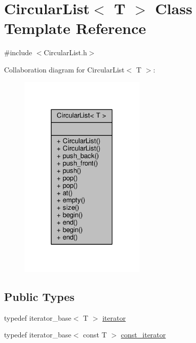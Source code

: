 \hypertarget{classCircularList}{\section{Circular\-List$<$ T $>$ Class Template Reference}
\label{classCircularList}
}


{\ttfamily \#include $<$Circular\-List.\-h$>$}



Collaboration diagram for Circular\-List$<$ T $>$\-:\nopagebreak
\begin{figure}[H]
\begin{center}
\leavevmode
\includegraphics[width=170pt]{classCircularList__coll__graph}
\end{center}
\end{figure}
\subsection*{Public Types}
\begin{DoxyCompactItemize}
\item 
typedef iterator\-\_\-base$<$ T $>$ \hyperlink{classCircularList_afe862594ad46e6d63c779b3dd100d831}{iterator}
\item 
typedef iterator\-\_\-base$<$ const T $>$ \hyperlink{classCircularList_a7ecb4e9d89db260f162d1dbb79339d8a}{const\-\_\-iterator}
\end{DoxyCompactItemize}
